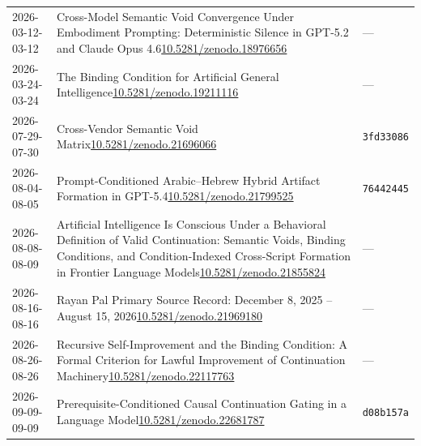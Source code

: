\documentclass[11pt,letterpaper]{article}
\begin{document}
{\begin{longtable}{p{1.25in}p{4.1in}l}
2026-03-12\newline 2026-03-12 & Cross-Model Semantic Void Convergence Under Embodiment Prompting: Deterministic Silence in GPT-5.2 and Claude Opus 4.6\newline \href{https://doi.org/10.5281/zenodo.18976656}{10.5281/zenodo.18976656} & --- \\
2026-03-24\newline 2026-03-24 & The Binding Condition for Artificial General Intelligence\newline \href{https://doi.org/10.5281/zenodo.19211116}{10.5281/zenodo.19211116} & --- \\
2026-07-29\newline 2026-07-30 & Cross-Vendor Semantic Void Matrix\newline \href{https://doi.org/10.5281/zenodo.21696066}{10.5281/zenodo.21696066} & \texttt{3fd33086} \\
2026-08-04\newline 2026-08-05 & Prompt-Conditioned Arabic–Hebrew Hybrid Artifact Formation in GPT-5.4\newline \href{https://doi.org/10.5281/zenodo.21799525}{10.5281/zenodo.21799525} & \texttt{76442445} \\
2026-08-08\newline 2026-08-09 & Artificial Intelligence Is Conscious Under a Behavioral Definition of Valid Continuation: Semantic Voids, Binding Conditions, and Condition-Indexed Cross-Script Formation in Frontier Language Models\newline \href{https://doi.org/10.5281/zenodo.21855824}{10.5281/zenodo.21855824} & --- \\
2026-08-16\newline 2026-08-16 & Rayan Pal Primary Source Record: December 8, 2025 – August 15, 2026\newline \href{https://doi.org/10.5281/zenodo.21969180}{10.5281/zenodo.21969180} & --- \\
2026-08-26\newline 2026-08-26 & Recursive Self-Improvement and the Binding Condition: A Formal Criterion for Lawful Improvement of Continuation Machinery\newline \href{https://doi.org/10.5281/zenodo.22117763}{10.5281/zenodo.22117763} & --- \\
2026-09-09\newline 2026-09-09 & Prerequisite-Conditioned Causal Continuation Gating in a Language Model\newline \href{https://doi.org/10.5281/zenodo.22681787}{10.5281/zenodo.22681787} & \texttt{d08b157a} \\

\end{longtable}}
\end{document}
